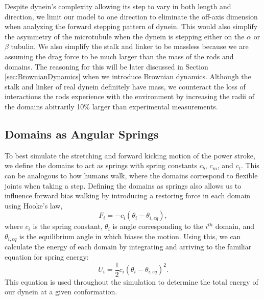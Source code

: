 Despite dynein's complexity allowing its step to vary in both length and direction, we limit our model to one direction to eliminate the off-axis dimension when analyzing the forward stepping pattern of dynein. This would also simplify the asymmetry of the microtubule when the dynein is stepping either on the $\alpha$ or $\beta$ tubulin. We also simplify the stalk and linker to be massless because we are assuming the drag force to be much larger than the mass of the rods and domains. The reasoning for this will be later discussed in Section \ref{sec:BrownianDynamics} when we introduce Brownian dynamics. Although the stalk and linker of real dynein definitely have mass, we counteract the loss of interactions the rods experience with the environment by increasing the radii of the domains abitrarily 10\% larger than experimental measurements.

\subsection{Domains as Angular Springs}
To best simulate the stretching and forward kicking motion of the power stroke, we define the domains to act as springs with spring constants $c_b$, $c_m$, and $c_t$. This can be analogous to how humans walk, where the domains correspond to flexible joints when taking a step. Defining the domains as springs also allows us to influence forward bias walking by introducing a restoring force in each domain using Hooke's law, 
\begin{equation}
    F_i=-c_i(\theta_i-\theta_{i,eq}),
\end{equation}
where $c_i$ is the spring constant, $\theta_i$ is angle corresponding to the $i^{th}$ domain, and $\theta_{i,eq}$ is the equilibrium angle in which biases the motion. Using this, we can calculate the energy of each domain by integrating and arriving to the familiar equation for spring energy:
\begin{equation} \label{eqn:energy}
    U_i=\frac{1}{2}c_i(\theta_i-\theta_{i,eq})^2.
\end{equation}
This equation is used throughout the simulation to determine the total energy of our dynein at a given conformation. 


